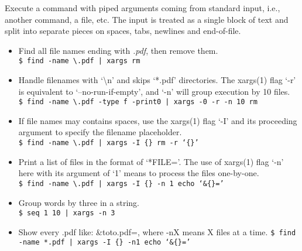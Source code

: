 Execute a command with piped arguments coming from standard input, i.e., another command, a file, etc. The input is treated as a single block of text and split into separate pieces on spaces, tabs, newlines and end-of-file.
    
\begin{itemize}[label={-}, leftmargin=*]
    \item Find all file names ending with \emph{.pdf}, then remove them.\\
    {\tt \$ find -name \textbackslash*.pdf | xargs rm}
    
    \item Handle filenames with `\textbackslash n' and skips `*.pdf' directories. The xargs(1) flag `-r' is equivalent to `--no-run-if-empty', and `-n' will group execution by 10 files.\\
    {\tt \$ find -name \textbackslash*.pdf -type f -print0 | xargs -0 -r -n 10 rm}
    
    \item If file names may contains spaces, use the xargs(1) flag `-I' and its proceeding argument to specify the filename placeholder.\\
    {\tt \$ find -name \textbackslash*.pdf | xargs -I \{\} rm -r `\{\}'}
    
    \item Print a list of files in the format of `*FILE='. The use of xargs(1) flag `-n' here with its argument of `1' means to process the files one-by-one.\\
    {\tt \$ find -name \textbackslash*.pdf | xargs -I \{\} -n 1 echo `\&\{\}='}
    
    \item Group words by three in a string.\\
    {\tt \$ seq 1 10 | xargs -n 3}
    
    \item Show every .pdf like:	{\&toto.pdf=}, where -nX means X files at a time.
    {\tt \$ find -name *.pdf | xargs -I \{\} -n1 echo `\&\{\}='}
\end{itemize}